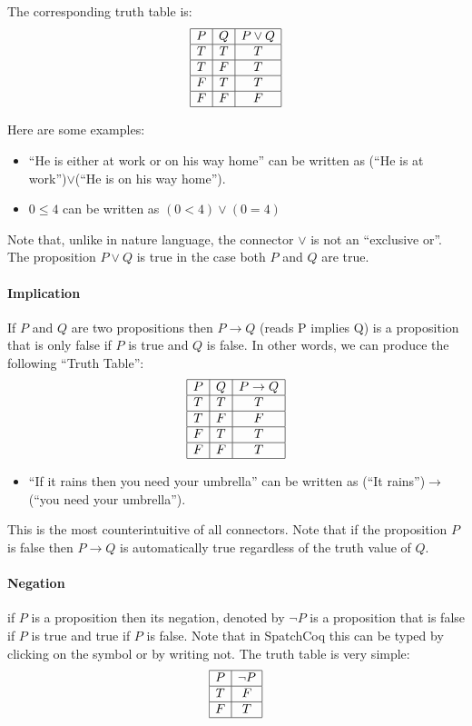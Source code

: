  The corresponding truth table is: 
 $$\begin{array}{|c|c|c|}\hline P & Q & P\lor Q \\\hline T & T & T \\\hline T & F & T \\\hline F & T & T \\\hline F & F & F\\ \hline\end{array}$$
 
 Here are some examples:

\begin{itemize}
\item ``He is either at work or on his way home'' can be written as (``He is  at work'')$\lor$(``He is on his way home'').
\item $0\le 4$ can be  written as $(0<4)\lor (0=4)$ 
\end{itemize}
Note that, unlike in nature language, the connector $\lor$ is not an ``exclusive or''. The proposition $P\lor Q$ is true in the case both $P$ and $Q$ are true.


\paragraph{\bf Implication} If $P$ and $Q$ are two propositions then  $P\rightarrow Q$  (reads P implies Q) is a proposition that is only false if  $P$ is true and $Q$ is false. In other words, we can produce the following ``Truth Table'':
$$\begin{array}{|c|c|c|}\hline P & Q & P\rightarrow Q \\\hline T & T & T \\\hline T & F & F \\\hline F & T & T \\\hline F & F & T\\ \hline\end{array}$$

\begin{itemize}
\item ``If it rains then you need your umbrella'' can be written as (``It rains'')$\rightarrow$(``you need your umbrella'').

\end{itemize}
This is the most counterintuitive of all connectors. Note that if the proposition $P$ is false then $P\rightarrow Q$ is automatically true regardless of the truth value of $Q$.

\paragraph{\bf Negation}
if $P$ is a proposition then its negation, denoted by $\neg P$  is a proposition that is  false if  $P$ is true and true if $P$ is false. Note that in SpatchCoq this can be typed by clicking on the symbol or by writing not.
The truth table is very simple:
$$\begin{array}{|c|c|}\hline P & \neg P\\\hline T & F \\\hline F & T\\ \hline\end{array}$$



